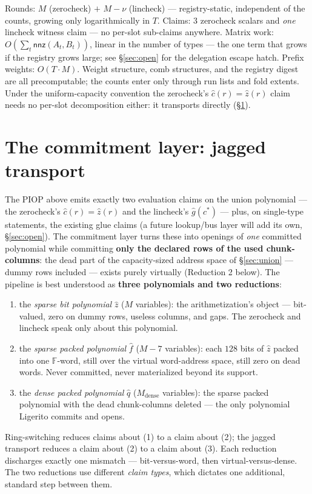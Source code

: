 \documentclass[11pt]{article}
\newcommand{\F}{\mathbb{F}}                       %
\newcommand{\nnz}{\mathsf{nnz}}
\theoremstyle{definition}
\begin{document}
Rounds: $M$ (zerocheck) $+$ $M - \nu$ (lincheck) --- registry-static,
independent of the counts, growing only logarithmically in $T$. Claims:
$3$ zerocheck scalars and \emph{one} lincheck witness claim --- no
per-slot sub-claims anywhere. Matrix work: $O(\sum_t \nnz(A_t, B_t))$,
linear in the number of types --- the one term that grows if the registry
grows large; see \S\ref{sec:open} for the delegation escape hatch. Prefix
weights: $O(T \cdot M)$. Weight structure, comb structures, and the
registry digest are all precomputable; the counts enter only through run
lists and fold extents. Under the uniform-capacity convention the
zerocheck's $\hat c(r) = \hat z(r)$ claim needs no per-slot decomposition
either: it transports directly (\S\ref{sec:commit}).

\section{The commitment layer: jagged transport}\label{sec:commit}

The PIOP above emits exactly two evaluation claims on the union
polynomial --- the zerocheck's $\hat c(r) = \hat z(r)$ and the lincheck's
$\hat g(c^*)$ --- plus, on single-type statements, the existing glue
claims (a future lookup/bus layer will add its own, \S\ref{sec:open}).
The commitment layer
turns these into openings of \emph{one} committed polynomial while
committing \textbf{only the declared rows of the used chunk-columns}: the
dead part of the capacity-sized address space of \S\ref{sec:union} ---
dummy rows included --- exists purely virtually (Reduction 2 below). The
pipeline is best
understood as \textbf{three polynomials and two reductions}:
\begin{enumerate}[nosep]
  \item the \emph{sparse bit polynomial} $\hat z$ ($M$ variables): the
        arithmetization's object --- bit-valued, zero on dummy rows,
        useless columns, and gaps. The zerocheck and lincheck speak only
        about this polynomial.
  \item the \emph{sparse packed polynomial} $\hat f$ ($M-7$ variables):
        each $128$ bits of $\hat z$ packed into one $\F$-word, still over
        the virtual word-address space, still zero on dead words. Never
        committed, never materialized beyond its support.
  \item the \emph{dense packed polynomial} $\hat q$
        ($M_{\mathrm{dense}}$ variables): the sparse packed polynomial
        with the dead chunk-columns deleted --- the only polynomial
        Ligerito commits and opens.
\end{enumerate}
Ring-switching reduces claims about (1) to a claim about (2); the jagged
transport reduces a claim about (2) to a claim about (3). Each reduction
discharges exactly one mismatch --- bit-versus-word, then
virtual-versus-dense. The two reductions use different \emph{claim
types}, which dictates one additional, standard step between them.
\end{document}
